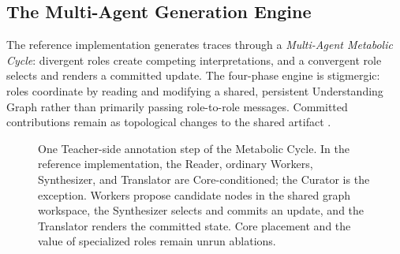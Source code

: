 \documentclass[11pt]{article}
\begin{document}
\subsection{The Multi-Agent Generation Engine}
\label{sec:multi-agent}

The reference implementation generates traces through a \emph{Multi-Agent
Metabolic Cycle}: divergent roles create competing interpretations, and a
convergent role selects and renders a committed update. The four-phase engine
is stigmergic: roles coordinate by reading and modifying a shared, persistent
Understanding Graph rather than primarily passing role-to-role messages.
Committed contributions remain as topological changes to the shared artifact
\cite{westerberg2026understanding}.

\begin{figure}[htbp]
    \centering
    \resizebox{\textwidth}{!}{}
    \caption{One Teacher-side annotation step of the Metabolic Cycle. In the reference implementation, the Reader, ordinary Workers, Synthesizer, and Translator are Core-conditioned; the Curator is the exception. Workers propose candidate nodes in the shared graph workspace, the Synthesizer selects and commits an update, and the Translator renders the committed state. Core placement and the value of specialized roles remain unrun ablations.}
    \label{fig:metabolic-cycle}
\end{figure}
\FloatBarrier
\end{document}
